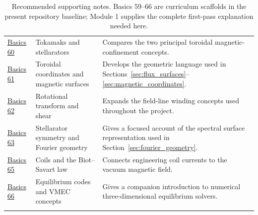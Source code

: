 \documentclass[11pt]{article}
\begin{document}
\begin{longtable}{>{\RaggedRight\arraybackslash}p{} >{\RaggedRight\arraybackslash}p{} >{\RaggedRight\arraybackslash}p{}}
\href{run:basics/basics_60_tokamaks_and_stellarators.pdf}{Basics 60} & Tokamaks and stellarators & Compares the two principal toroidal magnetic-confinement concepts.\\
\href{run:basics/basics_61_toroidal_coordinates_and_magnetic_surfaces.pdf}{Basics 61} & Toroidal coordinates and magnetic surfaces & Develops the geometric language used in Sections~\ref{sec:flux_surfaces}--\ref{sec:magnetic_coordinates}.\\
\href{run:basics/basics_62_rotational_transform_magnetic_shear_and_resonances.pdf}{Basics 62} & Rotational transform and shear & Expands the field-line winding concepts used throughout the project.\\
\href{run:basics/basics_63_stellarator_symmetry_and_fourier_geometry.pdf}{Basics 63} & Stellarator symmetry and Fourier geometry & Gives a focused account of the spectral surface representation used in Section~\ref{sec:fourier_geometry}.\\
\href{run:basics/basics_65_magnetic_field_coils_and_biot_savart_law.pdf}{Basics 65} & Coils and the Biot--Savart law & Connects engineering coil currents to the vacuum magnetic field.\\
\href{run:basics/basics_66_mhd_equilibrium_codes_and_vmec_concepts.pdf}{Basics 66} & Equilibrium codes and VMEC concepts & Gives a companion introduction to numerical three-dimensional equilibrium solvers.\\
\bottomrule
\caption{Recommended supporting notes. Basics 59--66 are curriculum scaffolds in the present repository baseline; Module 1 supplies the complete first-pass explanation needed here.}
\label{tab:module1_prerequisites}
\end{longtable}
\end{document}
